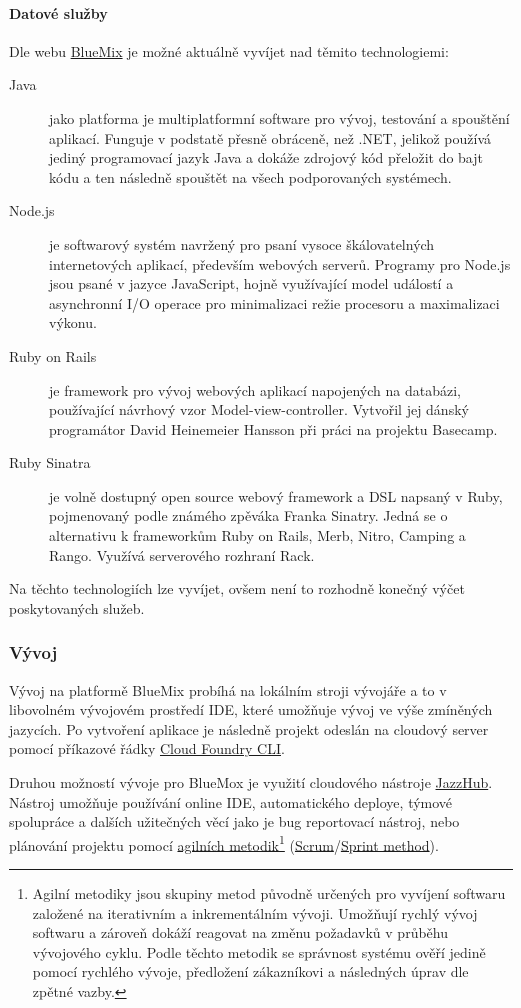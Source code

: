 \paragraph{Datové služby}
Dle webu \href{https://ace.ng.bluemix.net}{BlueMix}\cite{bluemix:web} je možné aktuálně vyvíjet nad těmito technologiemi:
\begin{description}
	\item [Java] jako platforma je multiplatformní software pro vývoj, testování a spouštění aplikací. Funguje v podstatě přesně obráceně, než .NET, jelikož používá jediný programovací jazyk Java a dokáže zdrojový kód přeložit do bajt kódu a ten následně spouštět na všech podporovaných systémech.
	\item [Node.js] je softwarový systém navržený pro psaní vysoce škálovatelných internetových aplikací, především webových serverů. Programy pro Node.js jsou psané v jazyce JavaScript, hojně využívající model událostí a asynchronní I/O operace pro minimalizaci režie procesoru a maximalizaci výkonu.\cite{wiki:node.js}
	\item [Ruby on Rails] je framework pro vývoj webových aplikací napojených na databázi, používající návrhový vzor Model-view-controller. Vytvořil jej dánský programátor David Heinemeier Hansson při práci na projektu Basecamp.\cite{wiki:rails}
	\item [Ruby Sinatra] je volně dostupný open source webový framework a DSL napsaný v Ruby, pojmenovaný podle známého zpěváka Franka Sinatry. Jedná se o alternativu k frameworkům Ruby on Rails, Merb, Nitro, Camping a Rango. Využívá serverového rozhraní Rack.\cite{wiki:sinatra}
\end{description}
Na těchto technologiích lze vyvíjet, ovšem není to rozhodně konečný výčet poskytovaných služeb.

\subsubsection{Vývoj}
Vývoj na platformě BlueMix probíhá na lokálním stroji vývojáře a to v libovolném vývojovém prostředí IDE, které umožňuje vývoj ve výše zmíněných jazycích. Po vytvoření aplikace je následně projekt odeslán na cloudový server pomocí příkazové řádky \href{https://github.com/cloudfoundry/cli}{Cloud Foundry CLI}.

Druhou možností vývoje pro BlueMox je využití cloudového nástroje \href{https://hub.jazz.net/}{JazzHub}. Nástroj umožňuje používání online IDE, automatického deploye, týmové spolupráce a dalších užitečných věcí jako je bug reportovací nástroj, nebo plánování projektu pomocí \href{http://cs.wikipedia.org/wiki/Agiln\%C3\%AD_metodiky}{agilních metodik}\footnote{Agilní metodiky jsou skupiny metod původně určených pro vyvíjení softwaru založené na iterativním a inkrementálním vývoji. Umožňují rychlý vývoj softwaru a zároveň dokáží reagovat na změnu požadavků v průběhu vývojového cyklu. Podle těchto metodik se správnost systému ověří jedině pomocí rychlého vývoje, předložení zákazníkovi a následných úprav dle zpětné vazby.\cite{wiki:agilniMetodiky}} (\href{http://en.wikipedia.org/wiki/Scrum_(software_development)}{Scrum\cite{wiki:scrum}}/\href{http://www.sprintmethod.cz/}{Sprint method}).

